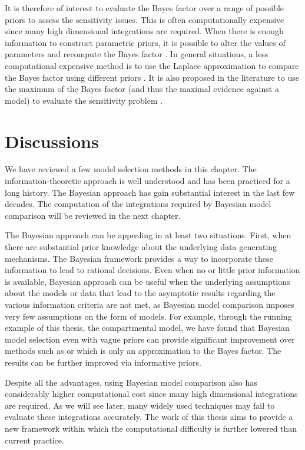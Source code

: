It is therefore of interest to evaluate the Bayes factor over a range of possible priors to assess the sensitivity issues. This is often computationally expensive since many high dimensional integrations are required. When there is enough information to construct parametric priors, it is possible to alter the values of parameters and recompute the Bayes factor \cite{McCulloch:1991hj}. In general situations, a less computational expensive method is to use the Laplace approximation to compare the Bayes factor using different priors \cite{Kass:1992tz}. It is also proposed in the literature to use the maximum of the Bayes factor (and thus the maximal evidence against a model) to evaluate the sensitivity problem \cite{Berger:1987iq}.

\section{Discussions}
\label{sec:Model Selection Discussion}

We have reviewed a few model selection methods in this chapter. The information-theoretic approach is well understood and has been practiced for a long history. The Bayesian approach has gain substantial interest in the last few decades. The computation of the integrations required by Bayesian model comparison will be reviewed in the next chapter.

The Bayesian approach can be appealing in at least two situations. First, when there are substantial prior knowledge about the underlying data generating mechanisms. The Bayesian framework provides a way to incorporate these information to lead to rational decisions. Even when no or little prior information is available, Bayesian approach can be useful when the underlying assumptions about the models or data that lead to the asymptotic results regarding the various information criteria are not met, as Bayesian model comparison imposes very few assumptions on the form of models. For example, through the running example of this thesis, the \pet compartmental model, we have found that Bayesian model selection even with vague priors can provide significant improvement over methods such as \aicc or \bic which is only an approximation to the Bayes factor. The results can be further improved via informative priors.

Despite all the advantages, using Bayesian model comparison also has considerably higher computational cost since many high dimensional integrations are required. As we will see later, many widely used techniques may fail to evaluate these integrations accurately. The work of this thesis aims to provide a new framework within which the computational difficulty is further lowered than current practice.

